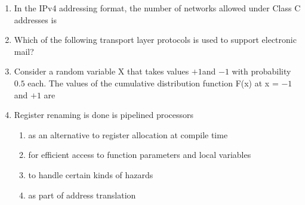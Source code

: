 \documentclass[journal]{IEEEtran}
\numberwithin{equation}{enumi}
\numberwithin{figure}{enumi}
\begin{document}
\begin{enumerate}
\item In the IPv4 addressing format, the number of networks allowed under Class C addresses is
\begin{enumerate}
\end{enumerate}

\item Which of the following transport layer protocols is used to support electronic mail?
\begin{enumerate}
\end{enumerate}

\item Consider a random variable X that takes values $+ 1$and $-1$ with probability $0.5$ each. The values of the cumulative distribution function F(x) at x = $-1$ and $+1$ are 
\begin{enumerate}
\end{enumerate}

\item Register renaming is done is pipelined processors
\begin{enumerate}
   \item as an alternative to register allocation at compile time
   \item for efficient access to function parameters and local variables
   \item to handle certain kinds of hazards
   \item as part of address translation 
\end{enumerate}


\end{enumerate}
\end{document}
